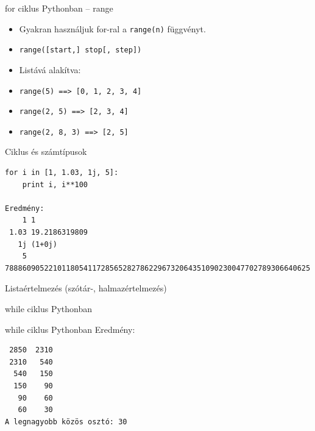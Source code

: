 \begin{frame}[fragile]
  {for ciklus Pythonban -- range}
  \begin{itemize}
    \item <+-| alert@+> Gyakran használjuk for-ral a \verb!range(n)! függvényt.
    \item <+-| alert@+-> \verb!range([start,] stop[, step])!
    \item <+-| alert@+-> Listává alakítva:
    \item <+-| alert@+> \verb!range(5) ==> [0, 1, 2, 3, 4]!
    \item <+-| alert@+> \verb!range(2, 5) ==> [2, 3, 4]!
    \item <+-| alert@+> \verb!range(2, 8, 3) ==> [2, 5]!
  \end{itemize}
\end{frame}

\begin{frame}[fragile]
  {Ciklus és számtípusok}
\begin{Verbatim}[label=példa, frame=single]
for i in [1, 1.03, 1j, 5]:
    print i, i**100

Eredmény:
    1 1
 1.03 19.2186319809
   1j (1+0j)
    5 7888609052210118054117285652827862296732064351090230047702789306640625
\end{Verbatim}
\end{frame}

\begin{frame}
    [fragile]{Listaértelmezés (szótár-, halmazértelmezés)}

      
\end{frame}

\begin{frame}[fragile]
  {while ciklus Pythonban}
      
\end{frame}

\begin{frame}[fragile]
  {while ciklus Pythonban}
    Eredmény:
\begin{Verbatim}
 2850  2310
 2310   540
  540   150
  150    90
   90    60
   60    30
A legnagyobb közös osztó: 30
\end{Verbatim}

\end{frame}

